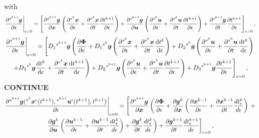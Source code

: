 \documentclass[../DC2017114Bouma.tex]{subfiles}
\begin{document}
with
\begin{align}
\left.\frac{\partial\hspace{0cm}^{s^{k+1}}{\boldsymbol{g}}}{\partial\epsilon}\right|_{\epsilon=0} = \left[\frac{\partial\hspace{0cm}^{s^{k+1}}{\boldsymbol{g}}}{\partial{\boldsymbol{x}}}\left(\frac{\partial\hspace{0cm}^{s^k}{\boldsymbol{x}}}{\partial\epsilon} + \frac{\partial\hspace{0cm}^{s^k}{\boldsymbol{x}}}{\partial t}\frac{\partial t^{k+1}}{\partial\epsilon}\right) + \frac{\partial\hspace{0cm}^{s^{k+1}}{\boldsymbol{g}}}{\partial{\boldsymbol{u}}}\left(\frac{\partial\hspace{0cm}^{s^k}{\boldsymbol{u}}}{\partial\epsilon} + \frac{\partial\hspace{0cm}^{s^k}{\boldsymbol{u}}}{\partial t}\frac{\partial t^{k+1}}{\partial\epsilon}\right) + \frac{\partial\hspace{0cm}^{s^{k+1}}{\boldsymbol{g}}}{\partial t}\frac{\partial t^{k+1}}{\partial\epsilon}\right]_{\epsilon=0},
\end{align}
\begin{multline}
\left.\frac{\partial\hspace{0cm}^{s^{k+1}}{\boldsymbol{g}}}{\partial\epsilon}\right|_{\epsilon=0} = \left[D_1\hspace{0cm}^{s^{k+1}}{\boldsymbol{g}}\left(\frac{\partial \boldsymbol{\Phi}}{\partial\epsilon} + D_1\hspace{0cm}^{s^{k}}{\boldsymbol{g}}\left(\frac{\partial\hspace{0cm}^{s^{k}}{\boldsymbol{x}}}{\partial\epsilon} + \frac{\partial\hspace{0cm}^{s^{k}}{\boldsymbol{x}}}{\partial t}\frac{\text{d}t^{k}}{\text{d}\epsilon}\right) + D_2\hspace{0cm}^{s^{k}}{\boldsymbol{g}}\left(\frac{\partial\hspace{0cm}^{s^{k}}{\boldsymbol{u}}}{\partial\epsilon} + \frac{\partial\hspace{0cm}^{s^{k}}{\boldsymbol{u}}}{\partial t}\frac{\text{d} t^{k}}{\text{d}\epsilon}\right)\right.\right.\\\left.\left. + D_3\hspace{0cm}^{s^{k}}{\boldsymbol{g}}\frac{\text{d} t^k}{\text{d} \epsilon} + \frac{\partial\hspace{0cm}^{s^{k}}{\boldsymbol{x}}}{\partial t}\frac{\text{d}t^{k+1}}{\text{d}\epsilon}\right) + D_2\hspace{0cm}^{s^{k+1}}{\boldsymbol{g}}\left(\frac{\partial\hspace{0cm}^{s^k}{\boldsymbol{u}}}{\partial\epsilon} + \frac{\partial\hspace{0cm}^{s^k}{\boldsymbol{u}}}{\partial t}\frac{\partial t^{k+1}}{\partial\epsilon}\right) + D_3\hspace{0cm}^{s^{k+1}}{\boldsymbol{g}}\frac{\partial t^{k+1}}{\partial\epsilon}\right]_{\epsilon=0},
\end{multline}
\textbf{CONTINUE}
\begin{multline}
\left.\frac{\partial\hspace{0cm}^{s^{k+1}}{\boldsymbol{g}}(\hspace{0cm}^{s^{k}}{\boldsymbol{x}}^\epsilon(t^{k+1}),\hspace{0cm}^{s^{k+1}}{\boldsymbol{u}}^\epsilon(t^{k+1}),t^{k+1})}{\partial\epsilon}\right|_{\epsilon=0} = \left[\frac{\partial\hspace{0cm}^{s^{k+1}}{\boldsymbol{g}}}{\partial{\boldsymbol{x}}}\left(\frac{\partial\boldsymbol{\Phi}}{\partial\epsilon} + \frac{\partial{\boldsymbol{g}}^{k}}{\partial{\boldsymbol{x}}}\left(\frac{\partial{\boldsymbol{x}}^{k-1}}{\partial\epsilon} + \frac{\partial{\boldsymbol{x}}^{k-1}}{\partial t}\frac{d t_\epsilon^{k}}{d \epsilon}\right)\right.\right. +\\ \left.\left.\frac{\partial{\boldsymbol{g}}^{k}}{\partial{\boldsymbol{u}}}\left(\frac{\partial{\boldsymbol{u}}^{k-1}}{\partial\epsilon} + \frac{\partial{\boldsymbol{u}}^{k-1}}{\partial t}\frac{d t_\epsilon^{k}}{d \epsilon}\right) + \frac{\partial{\boldsymbol{g}}^{k}}{\partial t}\frac{d t_\epsilon^{k}}{d\epsilon}\right) + \frac{\partial {\boldsymbol{g}}^{k+1}}{\partial t}\frac{dt^{k+1}_\epsilon}{d\epsilon}\right]_{\epsilon=0},
\end{multline}
\end{document}
